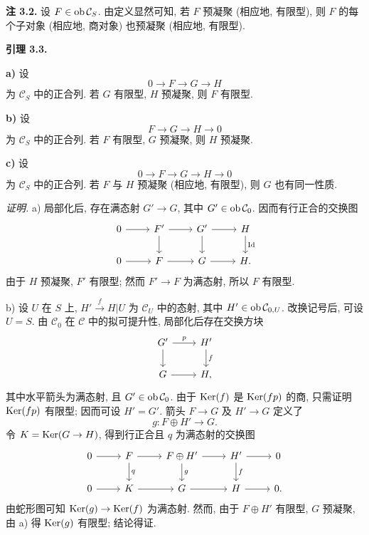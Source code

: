 \textbf{注 3.2.} 设 \(F\in\operatorname{ob}\mathcal C_S\). 由定义显然可知, 若 \(F\) 预凝聚 (相应地, 有限型), 则 \(F\) 的每个子对象 (相应地, 商对象) 也预凝聚 (相应地, 有限型).

\textbf{引理 3.3.}

\textbf{a)} 设
\[
  0\longrightarrow F\longrightarrow G\longrightarrow H
\]
为 \(\mathcal C_S\) 中的正合列. 若 \(G\) 有限型, \(H\) 预凝聚, 则 \(F\) 有限型.

\textbf{b)} 设
\[
  F\longrightarrow G\longrightarrow H\longrightarrow 0
\]
为 \(\mathcal C_S\) 中的正合列. 若 \(F\) 有限型, \(G\) 预凝聚, 则 \(H\) 预凝聚.

\textbf{c)} 设
\[
  0\longrightarrow F\longrightarrow G\longrightarrow H\longrightarrow 0
\]
为 \(\mathcal C_S\) 中的正合列. 若 \(F\) 与 \(H\) 预凝聚 (相应地, 有限型), 则 \(G\) 也有同一性质.

\emph{证明.} a) 局部化后, 存在满态射 \(G'\to G\), 其中 \(G'\in\operatorname{ob}\mathcal C_0\). 因而有行正合的交换图
\[
\begin{tikzcd}
0\arrow[r]&F'\arrow[r]\arrow[d]&G'\arrow[r]\arrow[d]&H\arrow[d,"\Id"]\\
0\arrow[r]&F\arrow[r]&G\arrow[r]&H .
\end{tikzcd}
\]
由于 \(H\) 预凝聚, \(F'\) 有限型; 然而 \(F'\to F\) 为满态射, 所以 \(F\) 有限型.

b) 设 \(U\) 在 \(S\) 上, \(H'\xrightarrow{f}H|U\) 为 \(\mathcal C_U\) 中的态射, 其中 \(H'\in\operatorname{ob}\mathcal C_{0,U}\). 改换记号后, 可设 \(U=S\). 由 \(\mathcal C_0\) 在 \(\mathcal C\) 中的拟可提升性, 局部化后存在交换方块
\[
\begin{tikzcd}
G' \arrow[r,"p"] \arrow[d] & H' \arrow[d,"f"]\\
G \arrow[r] & H,
\end{tikzcd}
\]
其中水平箭头为满态射, 且 \(G'\in\operatorname{ob}\mathcal C_0\). 由于 \(\operatorname{Ker}(f)\) 是 \(\operatorname{Ker}(fp)\) 的商, 只需证明 \(\operatorname{Ker}(fp)\) 有限型; 因而可设 \(H'=G'\). 箭头 \(F\to G\) 及 \(H'\to G\) 定义了
\[
  g:F\oplus H'\longrightarrow G.
\]
令 \(K=\operatorname{Ker}(G\to H)\), 得到行正合且 \(q\) 为满态射的交换图
\[
\begin{tikzcd}
0\arrow[r]&F\arrow[r]\arrow[d,"q"]&F\oplus H'\arrow[r]\arrow[d,"g"]&H'\arrow[r]\arrow[d,"f"]&0\\
0\arrow[r]&K\arrow[r]&G\arrow[r]&H\arrow[r]&0 .
\end{tikzcd}
\]
由蛇形图可知 \(\operatorname{Ker}(g)\to\operatorname{Ker}(f)\) 为满态射. 然而, 由于 \(F\oplus H'\) 有限型, \(G\) 预凝聚, 由 a) 得 \(\operatorname{Ker}(g)\) 有限型; 结论得证.

